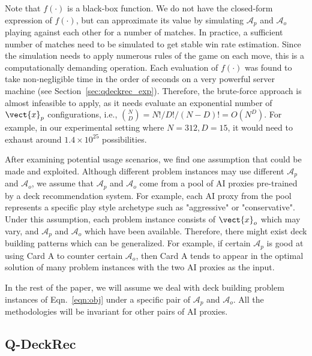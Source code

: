 Note that $f(\cdot)$ is a black-box function. We do not have the closed-form expression of $f(\cdot)$, but can approximate its value by simulating $\mathcal{A}_p$ and $\mathcal{A}_o$ playing against each other for a number of matches. In practice, a sufficient number of matches need to be simulated to get stable win rate estimation. Since the simulation needs to apply numerous rules of the game on each move, this is a computationally demanding operation. Each evaluation of $f(\cdot)$ was found to take non-negligible time in the order of seconds on a very powerful server machine (see Section~\ref{sec:qdeckrec_exp}). Therefore, the brute-force approach is almost infeasible to apply, as it needs evaluate an exponential number of $\vect{x}_p$ configurations, i.e., ${N\choose D}=N!/D!/(N-D)!=O(N^D)$. For example, in our experimental setting where $N=312, D=15$, it would need to exhaust around $1.4 \times 10^{25}$ possibilities. 


After examining potential usage scenarios, we find one assumption that could be made and exploited. Although different problem instances may use different $\mathcal{A}_p$ and $\mathcal{A}_o$, we assume that $\mathcal{A}_p$ and $\mathcal{A}_o$ come from a pool of AI proxies pre-trained by a deck recommendation system. For example, each AI proxy from the pool represents a specific play style archetype such as "aggressive" or "conservative". Under this assumption, each problem instance consists of $\vect{x}_o$ which may vary, and $\mathcal{A}_p$ and $\mathcal{A}_o$ which have been available. Therefore, there might exist deck building patterns which can be generalized. For example, if certain $\mathcal{A}_p$ is good at using Card A to counter certain $\mathcal{A}_o$, then Card A tends to appear in the optimal solution of many problem instances with the two AI proxies as the input.

In the rest of the paper, we will assume we deal with deck building problem instances of Eqn.~\ref{eqn:obj} under a specific pair of $\mathcal{A}_p$ and $\mathcal{A}_o$. All the methodologies will be invariant for other pairs of AI proxies.





\subsection{Q-DeckRec}

